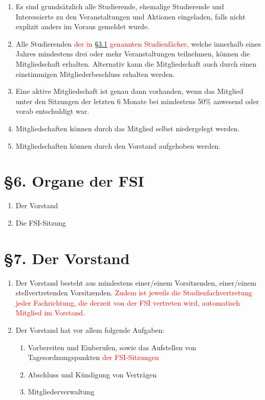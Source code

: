 \documentclass[a4paper,12pt]{article}
\newcommand{\red}[1]{\textcolor{red}{#1}}
\begin{document}
\begin{enumerate}
	\item
		Es sind grundsätzlich alle Studierende, ehemalige Studierende
		und Interessierte zu den Veranstaltungen und Aktionen
		eingeladen, falls nicht explizit anders im Voraus gemeldet
		wurde.
    	\item
		Alle Studierenden \red{der in \hyperref[3.1]{§3.1} genannten Studienfächer}, welche innerhalb
		eines Jahres mindestens drei oder mehr Veranstaltungen
		teilnehmen, können die Mitgliedschaft erhalten. Alternativ kann
		die Mitgliedschaft auch durch einen einstimmigen
		Mitgliederbeschluss erhalten werden.
	\item
		Eine aktive Mitgliedschaft ist genau dann vorhanden, wenn das
		Mitglied unter den Sitzungen der letzten 6 Monate bei mindestens
		50\% anwesend oder vorab entschuldigt war.
	\item
		Mitgliedschaften können durch das Mitglied selbst niedergelegt
		werden.
	\item 	Mitgliedschaften können durch den Vorstand aufgehoben werden.
\end{enumerate}

\section*{§6. Organe der FSI}

\begin{enumerate}
	\item
		Der Vorstand
	\item
		Die FSI-Sitzung
\end{enumerate}

\section*{§7. Der Vorstand}

\begin{enumerate}
	\item 
	Der Vorstand besteht aus mindestens einer/einem Vorsitzenden, einer/einem stellvertretenden Vorsitzenden. \red{Zudem ist jeweils die Studienfachvertretung jeder Fachrichtung, die derzeit von der FSI vertreten wird, automatisch Mitglied im Vorstand.} 
	\item
	Der Vorstand hat vor allem folgende Aufgaben:
		\begin{enumerate}[label=(\roman*)]
		\item
			Vorbereiten und Einberufen, sowie das Aufstellen von
			Tagesordnungspunkten \red{der FSI-Sitzungen}
			\item
			Abschluss und Kündigung von Verträgen
			\item
			Mitgliederverwaltung
		\end{enumerate}
\end{enumerate}
\end{document}
